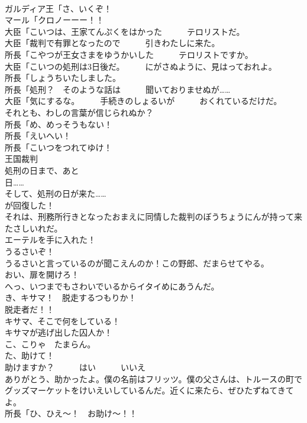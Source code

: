 \documentclass[8pt]{extreport}
\begin{document}
\begin{CJK}{UTF8}{min}
\\	ガルディア王「さ、いくぞ！	
\\	マール「クロノーーー！！	
\\	大臣「こいつは、王家てんぷくをはかった　　　テロリストだ。	
\\	大臣「裁判で有罪となったので　　　引きわたしに来た。	
\\	所長「こやつが王女さまをゆうかいした　　　テロリストですか。	
\\	大臣「こいつの処刑は3日後だ。　　　にがさぬように、見はっておれよ。	
\\	所長「しょうちいたしました。	
\\	所長「処刑？　そのような話は　　　聞いておりませぬが……	
\\	大臣「気にするな。　　　手続きのしょるいが　　　おくれているだけだ。　　　それとも、わしの言葉が信じられぬか？	
\\	所長「め、めっそうもない！	
\\	所長「えいへい！	
\\	所長「こいつをつれてゆけ！	
\\	王国裁判	
\\	処刑の日まで、あと
\\	日……	
\\	そして、処刑の日が来た……	
\\	が回復した！	
\\	それは、刑務所行きとなったおまえに同情した裁判のぼうちょうにんが持って来たさしいれだ。 
\\	エーテルを手に入れた！	
\\	うるさいぞ！	
\\	うるさいと言っているのが聞こえんのか！この野郎、だまらせてやる。	
\\	おい、扉を開けろ！	
\\	へっ、いつまでもさわいでいるからイタイめにあうんだ。	
\\	き、キサマ！　脱走するつもりか！	
\\	脱走者だ！！	
\\	キサマ、そこで何をしている！	
\\	キサマが逃げ出した囚人か！	
\\	こ、こりゃ　たまらん。	
\\	た、助けて！	
\\	助けますか？　　　はい　　　いいえ	
\\	ありがとう、助かったよ。僕の名前はフリッツ。僕の父さんは、トルースの町でグッズマーケットをけいえいしているんだ。近くに来たら、ぜひたずねてきてよ。	
\\	所長「ひ、ひえ～！　お助け～！！	

\end{CJK}
\end{document}
